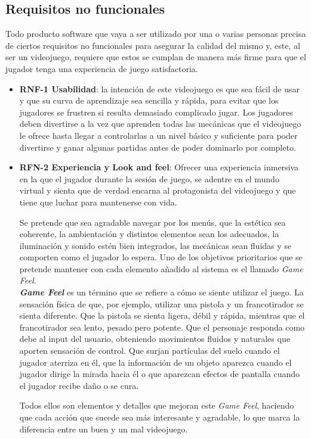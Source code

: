 \subsection{Requisitos no funcionales}
Todo producto software que vaya a ser utilizado por una o varias personas precisa de ciertos requisitos no funcionales para asegurar la calidad del mismo y, este, al ser un videojuego, requiere que estos se cumplan de manera más firme para que el jugador tenga una experiencia de juego satisfactoria.
\begin{itemize}
    \item \textbf{RNF-1 Usabilidad}: la intención de este videojuego es que sea fácil de usar y que su curva de aprendizaje sea sencilla y rápida, para evitar que los jugadores se frustren si resulta demasiado complicado jugar. Los jugadores deben divertirse a la vez que aprenden todas las mecánicas que el videojuego le ofrece hasta llegar a controlarlas a un nivel básico y suficiente para poder divertirse y ganar algunas partidas antes de poder dominarlo por completo.
    \item \textbf{RFN-2 Experiencia y Look and feel}: Ofrecer una experiencia inmersiva en la que el jugador durante la sesión de juego, se adentre en el mundo virtual y sienta que de verdad encarna al protagonista del videojuego y que tiene que luchar para mantenerse con vida.
    
    Se pretende que sea agradable navegar por los menús, que la estética sea coherente, la ambientación y distintos elementos sean los adecuados, la iluminación y sonido estén bien integrados, las mecánicas sean fluidas y se comporten como el jugador lo espera. Uno de los objetivos prioritarios que se pretende mantener con cada elemento añadido al sistema es el llamado \textit{Game Feel}.\\
    \textbf{\textit{Game Feel}} es un término que se refiere a cómo se siente utilizar el juego. La sensación física de que, por ejemplo, utilizar una pistola y un francotirador se sienta diferente. Que la pistola se sienta ligera, débil y rápida, mientras que el francotirador sea lento, pesado pero potente. Que el personaje responda como debe al input del usuario, obteniendo movimientos fluidos y naturales que aporten sensación de control. Que surjan partículas del suelo cuando el jugador aterriza en él, que la información de un objeto aparezca cuando el jugador dirige la mirada hacia él o que aparezcan efectos de pantalla cuando el jugador recibe daño o se cura.
    
    Todos ellos son elementos y detalles que mejoran este \textit{Game Feel}, haciendo que cada acción que sucede sea más interesante y agradable, lo que marca la diferencia entre un buen y un mal videojuego.


\end{itemize}
